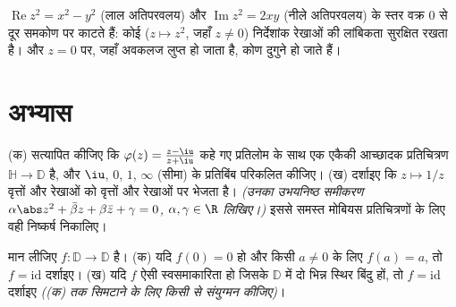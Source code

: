\begin{omfigure}

{\small $\operatorname{Re}z^2 = x^2 - y^2$ (लाल अतिपरवलय) और $\operatorname{Im}z^2 = 2xy$ (नीले अतिपरवलय) के स्तर वक्र
$0$ से दूर समकोण पर काटते हैं: कोई  ($z \mapsto z^2$,
जहाँ $z \neq 0$) निर्देशांक रेखाओं की लांबिकता सुरक्षित रखता है। और
$z = 0$ पर, जहाँ अवकलज लुप्त हो जाता है, कोण दुगुने हो जाते हैं।}
\end{omfigure}

\section{अभ्यास}

\begin{exercise}[$\star$]\label{exo:b3:conformal:1}
(क) सत्यापित कीजिए कि  $\varphi(z) = \frac{z -
\iu}{z + \iu}$ कहे गए प्रतिलोम के
साथ एक एकैकी आच्छादक प्रतिचित्रण $\mathbb H \to \mathbb D$ है, और $\iu$, $0$,
$1$, $\infty$ (सीमा) के प्रतिबिंब परिकलित कीजिए।
(ख) दर्शाइए कि $z \mapsto 1/z$ वृत्तों और रेखाओं को वृत्तों और रेखाओं पर
भेजता है। \emph{(उनका उभयनिष्ठ समीकरण $\alpha\abs z^2 + \bar\beta z + \beta\bar z + \gamma = 0$, $\alpha, \gamma \in \R$ लिखिए।)}
इससे समस्त मोबियस प्रतिचित्रणों के लिए वही निष्कर्ष निकालिए।
\end{exercise}

\begin{exercise}[$\star$]\label{exo:b3:conformal:2}
मान लीजिए $f \colon \mathbb D \to \mathbb D$  है।
(क) यदि $f(0) = 0$ हो और किसी $a \neq 0$ के लिए $f(a) = a$, तो $f
= \mathrm{id}$ दर्शाइए।
(ख) यदि $f$ ऐसी स्वसमाकारिता हो जिसके $\mathbb D$ में दो भिन्न स्थिर
बिंदु हों, तो $f = \mathrm{id}$ दर्शाइए \emph{((क) तक सिमटाने के लिए किसी
 से संयुग्मन कीजिए)}।
\end{exercise}

